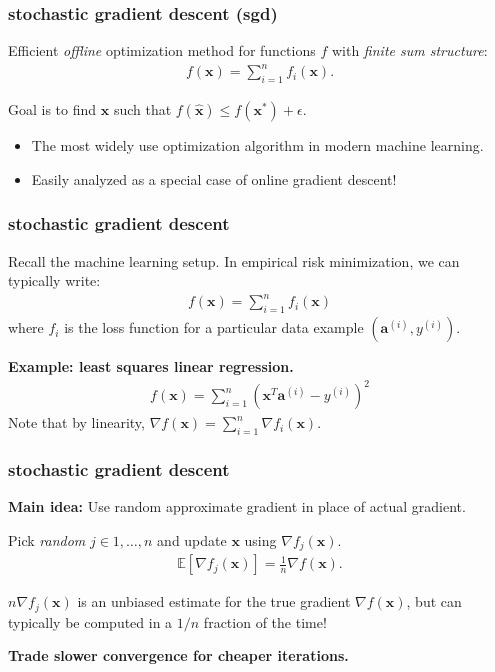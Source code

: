 \documentclass[compress]{beamer}
\newcommand{\bv}[1]{\mathbf{#1}}
\newcommand{\E}{\mathbb{E}}
\begin{document}
\begin{frame}
	\frametitle{stochastic gradient descent (sgd)}
	Efficient \emph{offline} optimization method for functions $f$ with \emph{finite sum structure}:
	\begin{align*}
		f(\bv{x}) = \sum_{i=1}^n f_i(\bv{x}).
	\end{align*}
	
	
	Goal is to find $\hat{\bv{x}}$ such that $f(\hat{\bv{x}}) \leq f(\bv{x}^*) + \epsilon$. 
	
	\begin{itemize}
		\item The most widely use optimization algorithm in modern machine learning. 
		\item Easily analyzed as a special case of {online} gradient descent! 
	\end{itemize}
\end{frame}

\begin{frame}[t]
	\frametitle{stochastic gradient descent}
	Recall the machine learning setup. In empirical risk minimization, we can typically write:
	\begin{align*}
		f(\bv{x}) = \sum_{i=1}^n f_i(\bv{x})
	\end{align*}
	where $f_i$ is the loss function for a particular data example $(\bv{a}^{(i)},y^{(i)} )$.
	\vspace{1em}
	
	\textbf{Example: least squares linear regression.}
	\begin{align*}
		f(\bv{x}) = \sum_{i=1}^n (\bv{x}^T\bv{a}^{(i)} - y^{(i)})^2
	\end{align*}
Note that by linearity, $\nabla f(\bv{x}) = \sum_{i=1}^n \nabla f_i(\bv{x})$. 
\end{frame}

\begin{frame}
	\frametitle{stochastic gradient descent}
	{\textbf{Main idea:} Use random approximate gradient in place of actual gradient.}
	
	Pick \emph{random} $j \in 1, \ldots, n$ and update $\bv{x}$  using $\nabla f_j(\bv{x})$. 
	\begin{align*}
		\E\left[\nabla f_j(\bv{x})\right] = \frac{1}{n}\nabla f(\bv{x}).
	\end{align*}

\vspace{2em}
	$n \nabla f_j(\bv{x})$ is an unbiased estimate for the true gradient $\nabla f(\bv{x})$, but can typically be computed in a $1/n$ fraction of the time!
	

	
	\begin{center}
		\alert{\textbf{Trade slower convergence for cheaper iterations.}}
	\end{center}
\end{frame}
\end{document}
